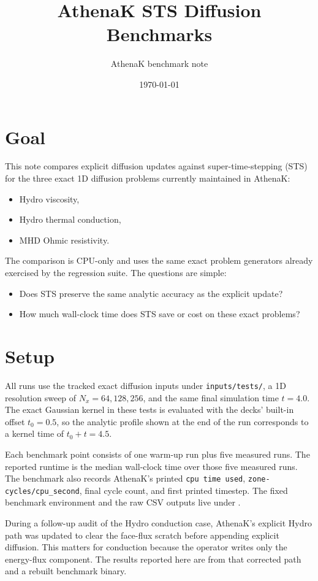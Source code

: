\documentclass[11pt]{article}
\title{AthenaK STS Diffusion Benchmarks}
\author{AthenaK benchmark note}
\date{\today}
\begin{document}
\maketitle

\section{Goal}

This note compares explicit diffusion updates against super-time-stepping (STS) for the
three exact 1D diffusion problems currently maintained in AthenaK:
\begin{itemize}
  \item Hydro viscosity,
  \item Hydro thermal conduction,
  \item MHD Ohmic resistivity.
\end{itemize}

The comparison is CPU-only and uses the same exact problem generators already exercised by
the regression suite. The questions are simple:
\begin{itemize}
  \item Does STS preserve the same analytic accuracy as the explicit update?
  \item How much wall-clock time does STS save or cost on these exact problems?
\end{itemize}

\section{Setup}

All runs use the tracked exact diffusion inputs under \texttt{inputs/tests/}, a 1D
resolution sweep of $N_x = 64, 128, 256$, and the same final simulation time
$t = 4.0$. The exact Gaussian kernel in these tests is evaluated with the decks'
built-in offset $t_0 = 0.5$, so the analytic profile shown at the end of the run
corresponds to a kernel time of $t_0 + t = 4.5$.

Each benchmark point consists of one warm-up run plus five measured runs. The reported
runtime is the median wall-clock time over those five measured runs. The benchmark also
records AthenaK's printed \texttt{cpu time used}, \texttt{zone-cycles/cpu\_second}, final
cycle count, and first printed timestep. The fixed benchmark environment and the raw CSV
outputs live under .

During a follow-up audit of the Hydro conduction case, AthenaK's explicit Hydro path was
updated to clear the face-flux scratch before appending explicit diffusion. This matters
for conduction because the operator writes only the energy-flux component. The results
reported here are from that corrected path and a rebuilt benchmark binary.
\end{document}
